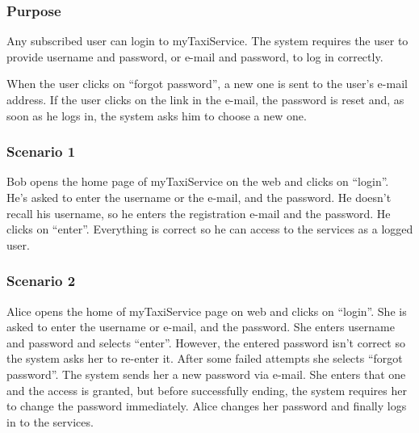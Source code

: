 \label{user-login}
\subsubsection{Purpose}
Any subscribed user can login to myTaxiService.
The system requires the user to provide username and password, or e-mail and password, to log in correctly.

When the user clicks on ``forgot password'', a new one is sent to the user's e-mail address. If the user clicks on the link in the e-mail, the password is reset and, as soon as he logs in, the system asks him to choose a new one.

\subsubsection{Scenario 1}
Bob opens the home page of myTaxiService on the web and clicks on ``login''.
He's asked to enter the username or the e-mail, and the password. He doesn't recall his username, so he enters the registration e-mail and the password. He clicks on ``enter''.
Everything is correct so he can access to the services as a logged user.

\subsubsection{Scenario 2}
Alice opens the home of myTaxiService page on web and clicks on ``login''.
She is asked to enter the username or e-mail, and the password.
She enters username and password and selects ``enter''. However, the entered password isn't correct so the system asks her to re-enter it.
After some failed attempts she selects ``forgot password''.
The system sends her a new password via e-mail. She enters that one and the access is granted, but before successfully ending, the system requires her to change the password immediately.
Alice changes her password and finally logs in to the services.

